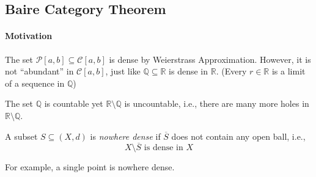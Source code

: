 \subsection{Baire Category Theorem}
\paragraph{Motivation}
The set $\mathcal{P}[a,b]\subseteq\mathcal{C}[a,b]$ is dense by Weierstrass Approximation.
However, it is not ``abundant'' in $\mathcal{C}[a,b]$, just like $\mathbb{Q}\subseteq\mathbb{R}$ is dense in $\mathbb{R}$.
(Every $r\in\mathbb{R}$ is a limit of a sequence in $\mathbb{Q}$)

The set $\mathbb{Q}$ is countable yet $\mathbb{R}\setminus\mathbb{Q}$ is uncountable, i.e., there are many more holes in $\mathbb{R}\setminus\mathbb{Q}$.

\begin{definition}
A subset $S\subseteq(X,d)$ is \emph{nowhere dense} if $\overline{S}$ does not contain any open ball, i.e., 
\[
\text{$X\setminus\overline{S}$ is dense in $X$}
\]
\end{definition}
For example, a single point is nowhere dense.

